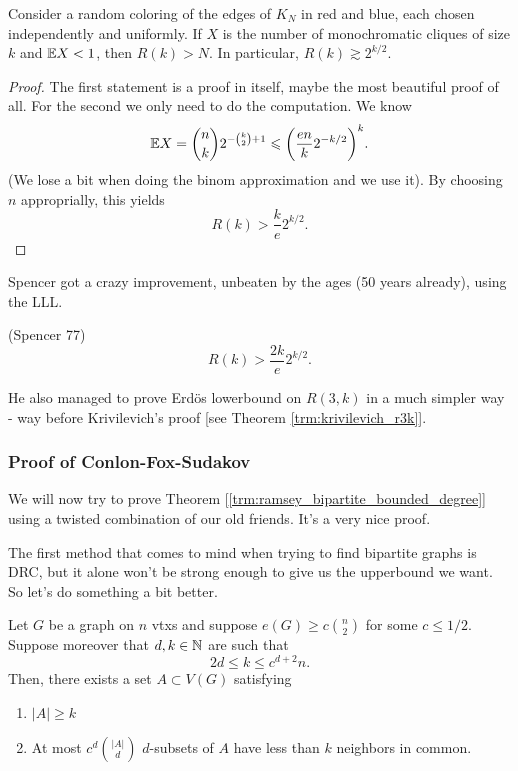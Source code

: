 \begin{theorem}
	Consider a random coloring of the edges of $K_N$ in red and blue,
	each chosen independently and uniformly. If $X$ is the number
	of monochromatic cliques of size $k$ and $\mathbb{E} X < 1$, then $R(k) >
	N$. In particular, $R(k) \gtrsim 2^{k/2}$.
\end{theorem}
\begin{proof}
	The first statement is a proof in itself, maybe the most beautiful
	proof of all. For the second we only need to do the computation.
	We know
	\[\mathbb{E} X = \binom{n}{k}2^{-\binom{k}{2} + 1}  \leqslant
	\bigg(\frac{en}{k}2^{-k/2}\bigg)^k.\]
	(We lose a bit when doing the binom approximation and we use it). By
	choosing $n$ approprially, this yields
	\[
		R(k) > \frac{k}{e}2^{k/2}.
	\]
\end{proof}

Spencer got a crazy improvement, unbeaten by the ages (50 years
already), using the LLL.
\begin{theorem} (Spencer 77)
	\[
		R(k) > \frac{2k}{e}2^{k/2}.
	\]
\end{theorem}

He also managed to prove Erdös lowerbound on $R(3,k)$ in a much
simpler way - way before Krivilevich's proof [see Theorem
\ref{trm:krivilevich_r3k}].

\subsubsection{Proof of Conlon-Fox-Sudakov}

We will now try to prove Theorem
[\ref{trm:ramsey_bipartite_bounded_degree}] using a twisted
combination of our old friends.
It's a very nice proof.

The first method that comes to mind when trying to find bipartite
graphs is DRC, but it alone won't be strong enough to give us the
upperbound we want. So let's do something a bit better.

\begin{lemma}
	\label{lemma:twisted_drc}
	Let $G$ be a graph on $n$ vtxs and suppose $e(G) \geq c\binom{n}{2}$
	for some $c \leq 1/2$.
	Suppose moreover that $d,k \in \mathbb{N}$ are such that
	\[
		2d \leq k \leq c^{d+2}n.
	\]
	Then, there exists a set $A \subset V(G)$ satisfying
	\begin{enumerate}[label=(\alph*)]
		\item $|A| \geq k$
		\item At most $c^d\binom{|A|}{d}$ $d$-subsets of $A$ have less than
			$k$ neighbors in common.
	\end{enumerate}
\end{lemma}

